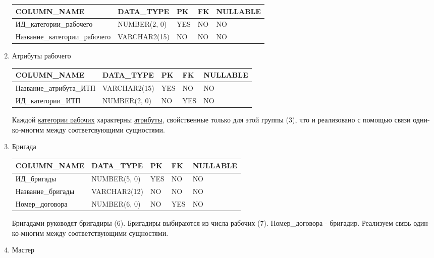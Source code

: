 \begin{enumerate}
\begin{tabular}{|p{4cm}|p{3cm}|p{1cm}|p{1cm}|p{2cm}|}
        {\bf COLUMN\_NAME} & {\bf DATA\_TYPE} & {\bf PK} & {\bf FK} & {\bf NULLABLE} \\ \hline
        ИД\_категории\_рабочего & NUMBER(2, 0) & YES & NO & NO \\ \hline
        Название\_категории\_рабочего & VARCHAR2(15) & NO & NO & NO \\ \hline

    \end{tabular}

    \item{Атрибуты рабочего}

    \begin{tabular}{|p{4cm}|p{3cm}|p{1cm}|p{1cm}|p{2cm}|} \hline

        {\bf COLUMN\_NAME} & {\bf DATA\_TYPE} & {\bf PK} & {\bf FK} & {\bf NULLABLE} \\ \hline
        Название\_атрибута\_ИТП & VARCHAR2(15) & YES & NO & NO \\ \hline
        ИД\_категории\_ИТП & NUMBER(2, 0) & NO & YES & NO \\ \hline

    \end{tabular}

    Каждой \underline{категории рабочих} характерны \underline{атрибуты}, свойственные только для этой группы (3), что и реализовано с помощью связи одни-ко-многим между соответсвующими сущностями.

    \item{Бригада}

    \begin{tabular}{|p{4cm}|p{3cm}|p{1cm}|p{1cm}|p{2cm}|} \hline

        {\bf COLUMN\_NAME} & {\bf DATA\_TYPE} & {\bf PK} & {\bf FK} & {\bf NULLABLE} \\ \hline
        ИД\_бригады & NUMBER(5, 0) & YES & NO & NO \\ \hline
        Название\_бригады & VARCHAR2(12) & NO & NO & NO \\ \hline
        Номер\_договора & NUMBER(6, 0) & NO & YES & NO \\ \hline

    \end{tabular}

    Бригадами руководят бригадиры (6).
    Бригадиры выбираются из числа рабочих (7).
    Номер\_договора - бригадир.
    Реализуем связь один-ко-многим между соответствующими сущностями.

    \item{Мастер}


\end{enumerate}

